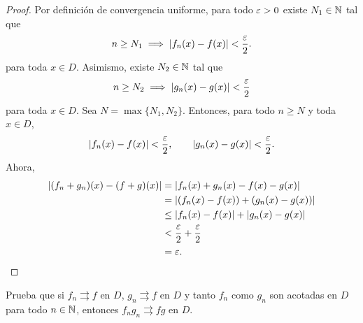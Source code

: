 \documentclass[12pt,a4paper]{article}
\begin{document}
    \begin{proof}
        Por definición de convergencia uniforme, para todo $\varepsilon>0$ existe $N_{1}\in\mathbb{N}$ tal que
        \begin{equation*}
            n\geq N_{1}\implies \abs{f_{n}(x)-f(x)}<\frac{\varepsilon}{2}.
        \end{equation*}
        para toda $x\in D$. Asimismo, existe $N_{2}\in\mathbb{N}$ tal que
        \begin{equation*}
            n\geq N_{2}\implies\abs{g_{n}(x)-g(x)}<\frac{\varepsilon}{2}
        \end{equation*}
        para toda $x\in D$. Sea $N=\max\{N_{1},N_{2}\}$. Entonces, para todo $n\geq N$ y toda
        $x\in D$,
        \begin{equation*}
            \abs{f_{n}(x)-f(x)}<\frac{\varepsilon}{2},\qquad\abs{g_{n}(x)-g(x)}<\frac{\varepsilon}{2}.
        \end{equation*}
        Ahora,
        \begin{align*}
            \abs{(f_{n}+g_{n})(x)-(f+g)(x)}&=\abs{f_{n}(x)+g_{n}(x)-f(x)-g(x)}\\
            &=\abs{(f_{n}(x)-f(x))+(g_{n}(x)-g(x))}\\
            &\leq\abs{f_{n}(x)-f(x)}+\abs{g_{n}(x)-g(x)}\\
            &<\frac{\varepsilon}{2}+\frac{\varepsilon}{2}\\
            &=\varepsilon.
        \end{align*}
    \end{proof}

    \begin{mdframed}[style=mdpinkbox,frametitle={Ejercicio 6}]
        Prueba que si $f_{n}\rightrightarrows f$ en $D$, $g_{n}\rightrightarrows f$ en $D$
        y tanto $f_{n}$ como $g_{n}$ son acotadas en $D$ para todo $n\in\mathbb{N}$, entonces
        $f_{n}g_{n}\rightrightarrows fg$ en $D$.
    \end{mdframed}
\end{document}
